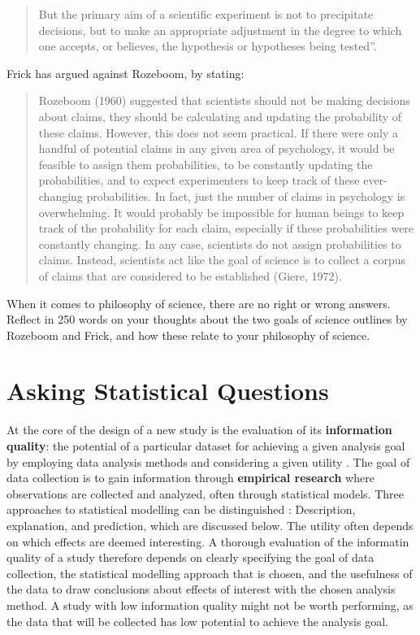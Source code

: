 \documentclass[
]{krantz}
\begin{document}
\begin{quote}
But the primary aim of a scientific experiment is not to precipitate decisions, but to make an appropriate adjustment in the degree to which one accepts, or believes, the hypothesis or hypotheses being tested''.
\end{quote}

Frick \citeyearpar{frick_appropriate_1996} has argued against Rozeboom, by stating:

\begin{quote}
Rozeboom (1960) suggested that scientists should not be making decisions about claims, they should be calculating and updating the probability of these claims. However, this does not seem practical. If there were only a handful of potential claims in any given area of psychology, it would be feasible to assign them probabilities, to be constantly updating the probabilities, and to expect experimenters to keep track of these ever-changing probabilities. In fact, just the number of claims in psychology is overwhelming. It would probably be impossible for human beings to keep track of the probability for each claim, especially if these probabilities were constantly changing. In any case, scientists do not assign probabilities to claims. Instead, scientists act like the goal of science is to collect a corpus of claims that are considered to be established (Giere, 1972).
\end{quote}

When it comes to philosophy of science, there are no right or wrong answers. Reflect in 250 words on your thoughts about the two goals of science outlines by Rozeboom and Frick, and how these relate to your philosophy of science.

\hypertarget{questions}{%
\chapter{Asking Statistical Questions}\label{questions}}

At the core of the design of a new study is the evaluation of its \textbf{information quality}: the potential of a particular dataset for achieving a given analysis goal by employing data analysis methods and considering a given utility
\citep{kenett_information_2016}. The goal of data collection is to gain information through \textbf{empirical research} where observations are collected and analyzed, often through statistical models. Three approaches to statistical modelling can be distinguished \citet{shmueli_explain_2010}: Description, explanation, and prediction, which are discussed below. The utility often depends on which effects are deemed interesting. A thorough evaluation of the informatin quality of a study therefore depends on clearly specifying the goal of data collection, the statistical modelling approach that is chosen, and the usefulness of the data to draw conclusions about effects of interest with the chosen analysis method. A study with low information quality might not be worth performing, as the data that will be collected has low potential to achieve the analysis goal.
\end{document}
